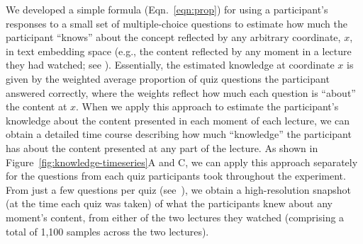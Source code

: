 \documentclass[10pt]{article}
\renewcommand{\nameref}[1]{\mbox{\textit{\oldnameref{#1}}}}
\begin{document}
We developed a simple formula (Eqn.~\ref{eqn:prop}) for using a participant's
responses to a small set of multiple-choice questions to estimate how much the
participant ``knows'' about the concept reflected by any arbitrary coordinate,
$x$, in text embedding space (e.g., the content reflected by any moment in a
lecture they had watched; see \nameref{subsec:traces}). Essentially, the
estimated knowledge at coordinate $x$ is given by the weighted average
proportion of quiz questions the participant answered correctly, where the
weights reflect how much each question is ``about'' the content at $x$. When we
apply this approach to estimate the participant's knowledge about the content
presented in each moment of each lecture, we can obtain a detailed time course
describing how much ``knowledge'' the participant has about the content
presented at any part of the lecture. As shown in
Figure~\ref{fig:knowledge-timeseries}A and C, we can apply this approach
separately for the questions from each quiz participants took throughout the
experiment. From just a few questions per quiz (see~\nameref{subsec:traces}),
we obtain a high-resolution snapshot (at the time each quiz was taken) of what
the participants knew about any moment's content, from either of the two
lectures they watched (comprising a total of 1,100 samples across the two
lectures).
\end{document}
